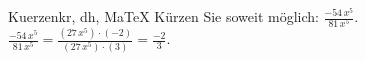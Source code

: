 \begin{MAufgabe}{Kuerzen}{kr, dh, MaTeX}
K\"urzen Sie soweit m\"oglich: $\frac{- 54\, x^5}{81\, x^5}$.\\ 
\ifLsg\MLoesung
\quad $\frac{- 54\, x^5}{81\, x^5}=\frac{(27\, x^5)\cdot(-2)}{(27\, x^5)\cdot(3)}=\frac{-2}{3}$.\else\relax\fi
 \end{MAufgabe}